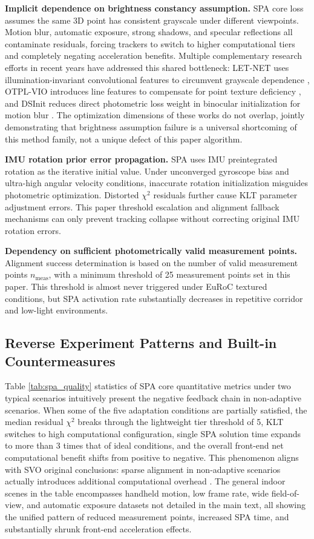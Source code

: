 \documentclass[journal,twoside,web]{ieeecolor}
\begin{document}
\textbf{Implicit dependence on brightness constancy assumption.} SPA core loss assumes the same 3D point has consistent grayscale under different viewpoints. Motion blur, automatic exposure, strong shadows, and specular reflections all contaminate residuals, forcing trackers to switch to higher computational tiers and completely negating acceleration benefits. Multiple complementary research efforts in recent years have addressed this shared bottleneck: LET-NET uses illumination-invariant convolutional features to circumvent grayscale dependence \cite{lin2024letnet}, OTPL-VIO introduces line features to compensate for point texture deficiency \cite{chen2026otpl}, and DSInit reduces direct photometric loss weight in binocular initialization for motion blur \cite{qiu2026dsinit}. The optimization dimensions of these works do not overlap, jointly demonstrating that brightness assumption failure is a universal shortcoming of this method family, not a unique defect of this paper algorithm.

\textbf{IMU rotation prior error propagation.} SPA uses IMU preintegrated rotation as the iterative initial value. Under unconverged gyroscope bias and ultra-high angular velocity conditions, inaccurate rotation initialization misguides photometric optimization. Distorted $\chi^{2}$ residuals further cause KLT parameter adjustment errors. This paper threshold escalation and alignment fallback mechanisms can only prevent tracking collapse without correcting original IMU rotation errors.

\textbf{Dependency on sufficient photometrically valid measurement points.} Alignment success determination is based on the number of valid measurement points $n_{\mathrm{meas}}$, with a minimum threshold of 25 measurement points set in this paper. This threshold is almost never triggered under EuRoC textured conditions, but SPA activation rate substantially decreases in repetitive corridor and low-light environments.

\subsection{Reverse Experiment Patterns and Built-in Countermeasures}

Table \ref{tab:spa_quality} statistics of SPA core quantitative metrics under two typical scenarios intuitively present the negative feedback chain in non-adaptive scenarios. When some of the five adaptation conditions are partially satisfied, the median residual $\chi^{2}$ breaks through the lightweight tier threshold of 5, KLT switches to high computational configuration, single SPA solution time expands to more than 3 times that of ideal conditions, and the overall front-end net computational benefit shifts from positive to negative. This phenomenon aligns with SVO original conclusions: sparse alignment in non-adaptive scenarios actually introduces additional computational overhead \cite{forster2017svo}. The general indoor scenes in the table encompasses handheld motion, low frame rate, wide field-of-view, and automatic exposure datasets not detailed in the main text, all showing the unified pattern of reduced measurement points, increased SPA time, and substantially shrunk front-end acceleration effects.
\end{document}
